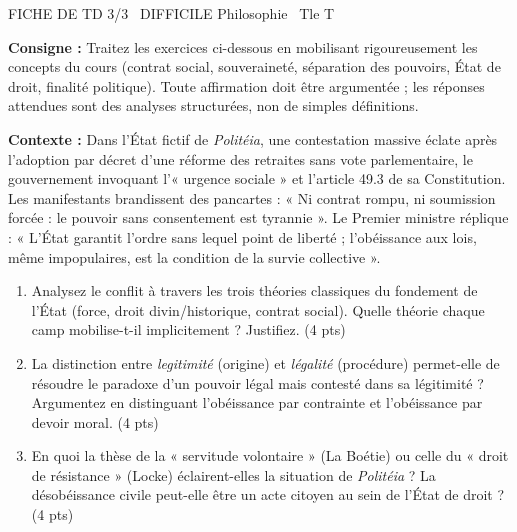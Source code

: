 \documentclass[11pt]{article}
\begin{document}
\begin{tcolorbox}[enhanced,colback=popink,colframe=popink,arc=10pt,boxrule=0pt,left=12pt,right=12pt,top=9pt,bottom=9pt]
{\color{white}\popxbold\small FICHE DE TD 3/3 \textbullet\ DIFFICILE \hfill Philosophie \textbullet\ Tle T\par}
\end{tcolorbox}
\vspace{4pt}
\noindent\textbf{Consigne :} Traitez les exercices ci-dessous en mobilisant rigoureusement les concepts du cours (contrat social, souveraineté, séparation des pouvoirs, État de droit, finalité politique). Toute affirmation doit être argumentée ; les réponses attendues sont des analyses structurées, non de simples définitions.

\begin{exercice}
\textbf{Contexte :} Dans l'État fictif de \textit{Politéia}, une contestation massive éclate après l'adoption par décret d'une réforme des retraites sans vote parlementaire, le gouvernement invoquant l'« urgence sociale » et l'article 49.3 de sa Constitution. Les manifestants brandissent des pancartes : « Ni contrat rompu, ni soumission forcée : le pouvoir sans consentement est tyrannie ». Le Premier ministre réplique : « L'État garantit l'ordre sans lequel point de liberté ; l'obéissance aux lois, même impopulaires, est la condition de la survie collective ».
\begin{enumerate}
    \item Analysez le conflit à travers les trois théories classiques du fondement de l'État (force, droit divin/historique, contrat social). Quelle théorie chaque camp mobilise-t-il implicitement ? Justifiez. (4 pts)
    \item La distinction entre \textit{legitimité} (origine) et \textit{légalité} (procédure) permet-elle de résoudre le paradoxe d'un pouvoir légal mais contesté dans sa légitimité ? Argumentez en distinguant l'obéissance par contrainte et l'obéissance par devoir moral. (4 pts)
    \item En quoi la thèse de la « servitude volontaire » (La Boétie) ou celle du « droit de résistance » (Locke) éclairent-elles la situation de \textit{Politéia} ? La désobéissance civile peut-elle être un acte citoyen au sein de l'État de droit ? (4 pts)
\end{enumerate}
\end{exercice}
\end{document}
